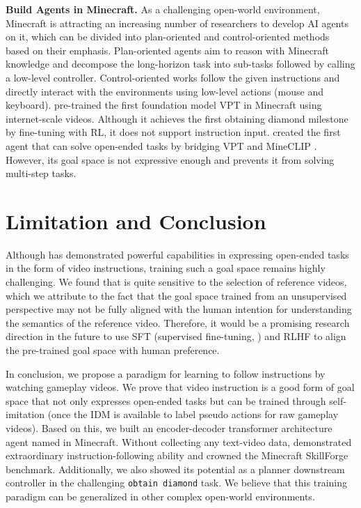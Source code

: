 \documentclass[11pt, a4paper, logo, one column]{craftjarvis}
\begin{document}
\textbf{Build Agents in Minecraft.} As a challenging open-world environment, Minecraft is attracting an increasing number of researchers to develop AI agents on it, which can be divided into plan-oriented \citep{deps, voyager} and control-oriented methods \citep{vpt, worldmc, steve1} based on their emphasis. Plan-oriented agents aim to reason with Minecraft knowledge and decompose the long-horizon task into sub-tasks followed by calling a low-level controller. Control-oriented works follow the given instructions and directly interact with the environments using low-level actions (mouse and keyboard). \cite{vpt} pre-trained the first foundation model VPT in Minecraft using internet-scale videos. Although it achieves the first obtaining diamond milestone by fine-tuning with RL, it does not support instruction input. \cite{steve1} created the first agent that can solve open-ended tasks by bridging VPT and MineCLIP \citep{minedojo}. 
However, its goal space is not expressive enough and prevents it from solving multi-step tasks. 

\section{Limitation and Conclusion}
\vspace{-0.20em}

Although \agent has demonstrated powerful capabilities in expressing open-ended tasks in the form of video instructions, training such a goal space remains highly challenging. We found that \agent is quite sensitive to the selection of reference videos, which we attribute to the fact that the goal space trained from an unsupervised perspective may not be fully aligned with the human intention for understanding the semantics of the reference video. Therefore, it would be a promising research direction in the future to use SFT (supervised fine-tuning, \cite{sft}) and RLHF \citep{rlhf} to align the pre-trained goal space with human preference. 

In conclusion, we propose a paradigm for learning to follow instructions by watching gameplay videos. We prove that video instruction is a good form of goal space that not only expresses open-ended tasks but can be trained through self-imitation (once the IDM is available to label pseudo actions for raw gameplay videos). Based on this, we built an encoder-decoder transformer architecture agent named \agent in Minecraft. Without collecting any text-video data, \agent demonstrated extraordinary instruction-following ability and crowned the Minecraft SkillForge benchmark. Additionally, we also showed its potential as a planner downstream controller in the challenging \texttt{obtain diamond} task. We believe that this training paradigm can be generalized in other complex open-world environments. 
\end{document}

